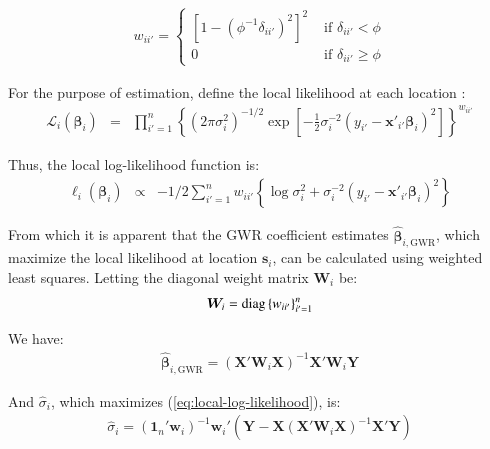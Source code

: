 \documentclass[authoryear, review, 11pt]{elsarticle}
\begin{document}
	\begin{eqnarray}
		w_{ii'} = \begin{cases} \left[1-\left(\phi^{-1}\delta_{ii'}\right)^2\right]^2 &\mbox{ if } \delta_{ii'} < \phi \\ 0 &\mbox{ if } \delta_{ii'} \geq \phi \end{cases}
	\end{eqnarray}
	
	For the purpose of estimation, define the local likelihood at each location \citep{Fotheringham:2002}:
	\begin{eqnarray}
		\mathcal{L}_i \left(\bm{\beta}_i \right) &=& \prod_{i'=1}^n \left\{ \left(2 \pi \sigma^2_i  \right)^{-1/2}  \exp\left[-\frac{1}{2} \sigma^{-2}_i  \left(y_{i'} - \bm{x}'_{i'} \bm{\beta}_i \right)^2 \right] \right\} ^ {w_{ii'}}
	\end{eqnarray}
			
	Thus, the local log-likelihood function is:
	\begin{eqnarray}\label{eq:local-log-likelihood}
		\ell_i\left(\bm{\beta}_i\right) &\propto& -1/2 \sum_{i'=1}^n w_{ii'} \left\{ \log{\sigma^2_i}  + \sigma^{-2}_i  \left(y_{i'} - \bm{x}'_{i'} \bm{\beta}_i \right)^2 \right\}
	\end{eqnarray}
	
	From which it is apparent that the GWR coefficient estimates $\hat{\bm{\beta}}_{i,\text{GWR}}$, which maximize the local likelihood at location $\bm{s}_i$, can be calculated using weighted least squares. Letting the diagonal weight matrix $\bm{W}_i$ be:
	\begin{eqnarray}
		\bm{W}_i =  {\rm diag}\left\{w_{ii'}\right\}_{i' = 1}^n
	\end{eqnarray}
	
	We have:	
	\begin{eqnarray}
		\hat{\bm{\beta}}_{i, \text{GWR}} = \left( \bm{X}'\bm{W}_i\bm{X} \right)^{-1} \bm{X}'\bm{W}_i\bm{Y}
	\end{eqnarray}
	
	And $\hat{\sigma}_i$, which maximizes (\ref{eq:local-log-likelihood}), is:
	\begin{eqnarray}
		\hat{\sigma}_i = \left(\bm{1}_n'\bm{w}_i \right)^{-1} \bm{w}_i'\left(\bm{Y}-\bm{X}\left(\bm{X}'\bm{W}_i\bm{X}\right)^{-1}\bm{X}'\bm{Y}\right)
	\end{eqnarray}
	
\end{document}

